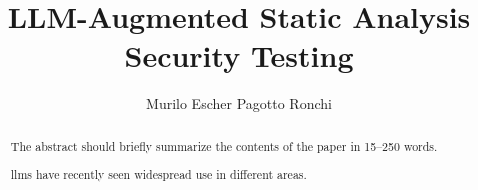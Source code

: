\documentclass[runningheads]{llncs}
\begin{document}
%
\title{LLM-Augmented Static Analysis Security Testing}
%
%
%
\author{Murilo Escher Pagotto Ronchi}
%
\maketitle %
%
%
\begin{abstract}
The abstract should briefly summarize the contents of the paper in
15--250 words.

\Aclp{llm} have recently seen widespread use in different areas.

\end{abstract}
%
%





%
%
\appendix
% 
%
%


%
\end{document}
